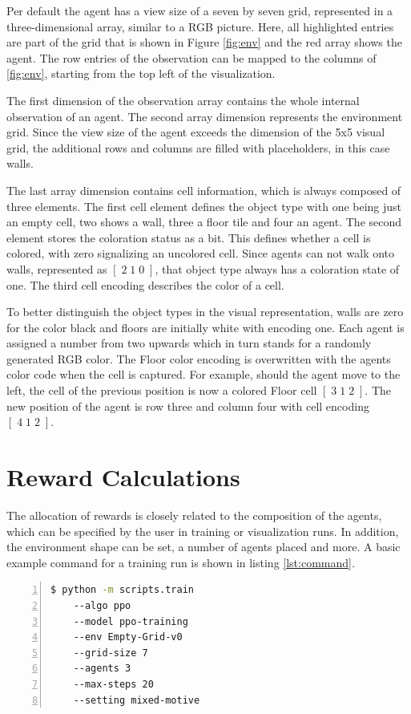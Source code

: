 Per default the agent has a view size of a seven by seven grid, represented in a three-dimensional array, similar to a RGB picture. Here, all highlighted entries are part of the grid that is shown in Figure \ref{fig:env} and the red array shows the agent. The row entries of the observation can be mapped to the columns of \ref{fig:env}, starting from the top left of the visualization. 

The first dimension of the observation array contains the whole internal observation of an agent. The second array dimension represents the environment grid. Since the view size of the agent exceeds the dimension of the 5x5 visual grid, the additional rows and columns are filled with placeholders, in this case walls.

The last array dimension contains cell information, which is always composed of three elements. The first cell element defines the object type with one being just an empty cell, two shows a wall, three a floor tile and four an agent. The second element stores the coloration status as a bit. This defines whether a cell is colored, with zero signalizing an uncolored cell. Since agents can not walk onto walls, represented as $[\;2\;1\;0\;]$, that object type always has a coloration state of one. The third cell encoding describes the color of a cell. 

To better distinguish the object types in the visual representation, walls are zero for the color black and floors are initially white with encoding one. Each agent is assigned a number from two upwards which in turn stands for a randomly generated RGB color. The Floor color encoding is overwritten with the agents color code when the cell is captured. For example, should the agent move to the left, the cell of the previous position is now a colored Floor cell $[\;3\;1\;2\;]$. The new position of the agent is row three and column four with cell encoding $[\;4\;1\;2\;]$.

\section{Reward Calculations}\label{reward_calculations}
The allocation of rewards is closely related to the composition of the agents, which can be specified by the user in training or visualization runs. In addition, the environment shape can be set, a number of agents placed and more. A basic example command for a training run is shown in listing \ref{lst:command}.

\begin{lstlisting}[float=htp,caption=Exemplary command to execute training with three agents in a coloring environment using PPO as algorithm,label=lst:command,language=bash, numbers=left, numberstyle=\tiny, numbersep=8pt ,xleftmargin=3ex,xrightmargin=1ex]
$ python -m scripts.train
    --algo ppo
    --model ppo-training
    --env Empty-Grid-v0 
    --grid-size 7
    --agents 3 
    --max-steps 20
    --setting mixed-motive
\end{lstlisting}

